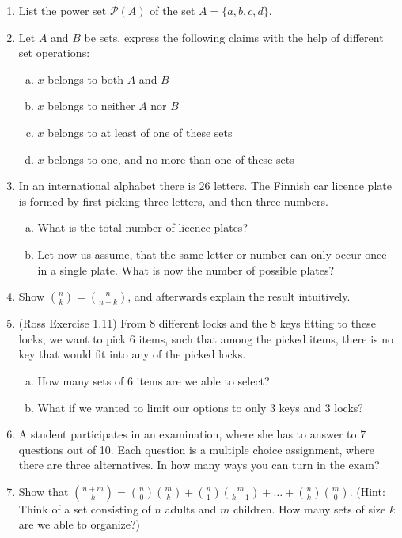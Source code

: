 \documentclass[12pt,a4paper,leqno]{report}
\theoremstyle{plain}
\theoremstyle{definition}
\begin{document}
\begin{enumerate}
\item List the power set $\mathcal{P}(A)$ of the set $A = \{a, b, c, d\}$.
\item Let $A$ and $B$ be sets. express the following claims with the help of different set operations:
\begin{enumerate}[a)]
\item $x$ belongs to both $A$ and $B$
\item $x$ belongs to neither $A$ nor $B$
\item $x$ belongs to at least of one of these sets
\item $x$ belongs to one, and no more than one of these sets
\end{enumerate}
\item In an international alphabet there is 26 letters. The Finnish car licence plate is formed by first picking three letters, and then three numbers.
\begin{enumerate}[a)]
\item What is the total number of licence plates?
\item Let now us assume, that the same letter or number can only occur once in a single plate. What is now the number of possible plates? 
\end{enumerate}
\item Show $\binom{n}{k} = \binom{n}{n-k}$, and afterwards explain the result intuitively.
\item (Ross Exercise 1.11) From 8 different locks and the 8 keys fitting to these locks, we want to pick 6 items, such that among the picked items, there is no key that would fit into any of the picked locks.
\begin{enumerate}[a)]
\item How many sets of 6 items are we able to select?
\item What if we wanted to limit our options to only 3 keys and 3 locks?
\end{enumerate}
\item A student participates in an examination, where she has to answer to 7 questions out of 10. Each question is a multiple choice assignment, where there are three alternatives. In how many ways you can turn in the exam?
\item Show that $\binom{n+m}{k} = \binom{n}{0} \binom{m}{k}  + \binom{n}{1} \binom{m}{k-1}  + \ldots + \binom{n}{k} \binom{m}{0}$. (Hint: Think of a set consisting of $n$ adults and $m$ children. How many sets of size $k$ are we able to organize?)

\end{enumerate}
\end{document}
